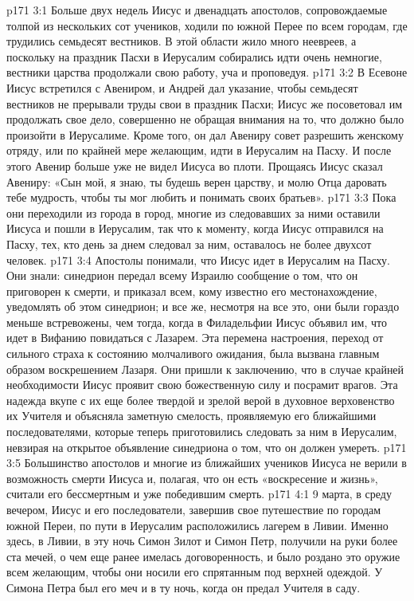 \vs p171 3:1 Больше двух недель Иисус и двенадцать апостолов, сопровождаемые толпой из нескольких сот учеников, ходили по южной Перее по всем городам, где трудились семьдесят вестников. В этой области жило много неевреев, а поскольку на праздник Пасхи в Иерусалим собирались идти очень немногие, вестники царства продолжали свою работу, уча и проповедуя.
\vs p171 3:2 В Есевоне Иисус встретился с Авениром, и Андрей дал указание, чтобы семьдесят вестников не прерывали труды свои в праздник Пасхи; Иисус же посоветовал им продолжать свое дело, совершенно не обращая внимания на то, что должно было произойти в Иерусалиме. Кроме того, он дал Авениру совет разрешить женскому отряду, или по крайней мере желающим, идти в Иерусалим на Пасху. И после этого Авенир больше уже не видел Иисуса во плоти. Прощаясь Иисус сказал Авениру: «Сын мой, я знаю, ты будешь верен царству, и молю Отца даровать тебе мудрость, чтобы ты мог любить и понимать своих братьев».
\vs p171 3:3 Пока они переходили из города в город, многие из следовавших за ними оставили Иисуса и пошли в Иерусалим, так что к моменту, когда Иисус отправился на Пасху, тех, кто день за днем следовал за ним, оставалось не более двухсот человек.
\vs p171 3:4 Апостолы понимали, что Иисус идет в Иерусалим на Пасху. Они знали: синедрион передал всему Израилю сообщение о том, что он приговорен к смерти, и приказал всем, кому известно его местонахождение, уведомлять об этом синедрион; и все же, несмотря на все это, они были гораздо меньше встревожены, чем тогда, когда в Филадельфии Иисус объявил им, что идет в Вифанию повидаться с Лазарем. Эта перемена настроения, переход от сильного страха к состоянию молчаливого ожидания, была вызвана главным образом воскрешением Лазаря. Они пришли к заключению, что в случае крайней необходимости Иисус проявит свою божественную силу и посрамит врагов. Эта надежда вкупе с их еще более твердой и зрелой верой в духовное верховенство их Учителя и объясняла заметную смелость, проявляемую его ближайшими последователями, которые теперь приготовились следовать за ним в Иерусалим, невзирая на открытое объявление синедриона о том, что он должен умереть.
\vs p171 3:5 Большинство апостолов и многие из ближайших учеников Иисуса не верили в возможность смерти Иисуса и, полагая, что он есть «воскресение и жизнь», считали его бессмертным и уже победившим смерть.
\vs p171 4:1 9 марта, в среду вечером, Иисус и его последователи, завершив свое путешествие по городам южной Переи, по пути в Иерусалим расположились лагерем в Ливии. Именно здесь, в Ливии, в эту ночь Симон Зилот и Симон Петр, получили на руки более ста мечей, о чем еще ранее имелась договоренность, и было роздано это оружие всем желающим, чтобы они носили его спрятанным под верхней одеждой. У Симона Петра был его меч и в ту ночь, когда он предал Учителя в саду.
